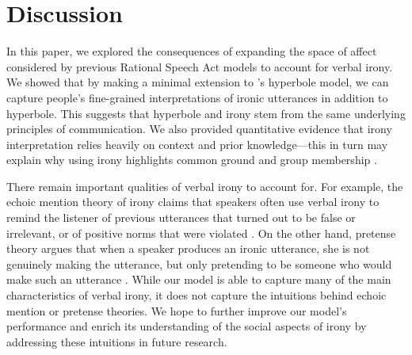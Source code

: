 \documentclass[10pt,letterpaper]{article}
\begin{document}

\section{Discussion}
In this paper, we explored the consequences of expanding the space of affect considered by previous Rational Speech Act models to account for verbal irony. We showed that by making a minimal extension to 's hyperbole model, we can capture people's fine-grained interpretations of ironic utterances in addition to hyperbole. This suggests that  hyperbole and irony stem from the same underlying principles of communication. We also provided quantitative evidence that irony interpretation relies heavily on context and prior knowledge---this in turn may explain why using irony highlights common ground and group membership \cite{gibbs2000irony}.

There remain important qualities of verbal irony to account for. For example, the echoic mention theory of irony claims that speakers often use verbal irony to remind the listener of previous utterances that turned out to be false or irrelevant, or of positive norms that were violated \cite{sperber1981irony, jorgensen1984test}. On the other hand, pretense theory argues that when a speaker produces an ironic utterance, she is not genuinely making the utterance, but only pretending to be someone who would make such an utterance \cite{clark1984pretense}. 
While our model is able to capture many of the main characteristics of verbal irony, it does not capture the intuitions behind echoic mention or pretense theories. We hope to further improve our model's performance and enrich its understanding of the social aspects of irony by addressing these intuitions in future research. 
\end{document}
